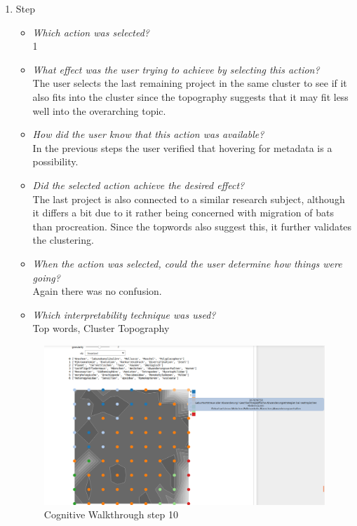 {\begin{enumerate}
		\item Step
		\begin{itemize}
			\item \textit{Which action was selected?} \\
			1
			\item \textit{What effect was the user trying to achieve by selecting this action?} \\
			The user selects the last remaining project in the same cluster to see if it also fits into the cluster since the topography suggests that it may fit less well into the overarching topic. 
			\item \textit{How did the user know that this action was available?} \\
			In the previous steps the user verified that hovering for metadata is a possibility. 
			\item \textit{Did the selected action achieve the desired effect?} \\
			The last project is also connected to a similar research subject, although it differs a bit due to it rather being concerned with migration of bats than procreation. Since the topwords also suggest this, it further validates the clustering. 
			\item \textit{When the action was selected, could the user determine how things were going?} \\
			Again there was no confusion.
			\item \textit{Which interpretability technique was used?}\\
			Top words, Cluster Topography
		\end{itemize}
		\begin{figure}[H]
			\centering
			\includegraphics[width=400px]{../chapters/validation/pics/8_c}
			\caption{\label{pic:step10} Cognitive Walkthrough step 10}
		\end{figure} \newpage
		

\end{enumerate}}
